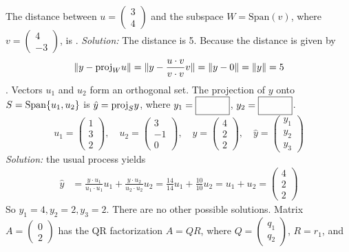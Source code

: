 \fi 
\ifnum {}
    The distance between $u=\begin{pmatrix} 3\\4\end{pmatrix}$ and the subspace $W=\text{Span}(v)$, where $v = \begin{pmatrix} 4\\-3\end{pmatrix}$, is \framebox{\strut\hspace{1cm}}.     
    \ifnum {} {\color{DarkBlue} \textit{Solution:} The distance is 5. Because the distance is given by $$\| y - \text{proj} _W u \| = \| y - \frac{u\cdot v}{v\cdot v}v \| = \| y - 0 \| = \|y \| = 5$$.   } \fi    
\fi 
\ifnum {}
    Vectors $u_1$ and $u_2$ form an orthogonal set. The projection of $y$ onto $S=\text{Span}\{u_1,u_2\}$ is $\hat y = \text{proj}_Sy$, where $y_1=\framebox{\strut\hspace{1cm}}$, 
    $y_2=\framebox{\strut\hspace{1cm}}$. $$u_1 = \begin{pmatrix} 1\\3\\2\end{pmatrix}, \quad u_2 = \begin{pmatrix} 3\\-1\\0\end{pmatrix}, \quad y = \begin{pmatrix} 4\\2\\2\end{pmatrix}, \quad \hat y = \begin{pmatrix} y_1\\y_2\\y_3\end{pmatrix}$$
    \ifnum {} {\color{DarkBlue} \textit{Solution:} the usual process yields
    \begin{align}
        \hat y &= \frac{y\cdot u_1}{u_1 \cdot u_1}u_1 + \frac{y\cdot u_2}{u_2 \cdot u_2}u_2 
        = \frac{14}{14}u_1 + \frac{10}{10}u_2 = u_1 + u_2 = \begin{pmatrix} 4\\2\\2\end{pmatrix}
    \end{align}
    So $y_1=4, y_2=2, y_3=2$. There are no other possible solutions. } \fi    
\fi 
\ifnum {}
    Matrix $A = \begin{pmatrix} 0\\2\end{pmatrix}$ has the QR factorization $A = QR$, where $Q = \begin{pmatrix} q_1\\q_2\end{pmatrix}$, $R = r_1$, and 

